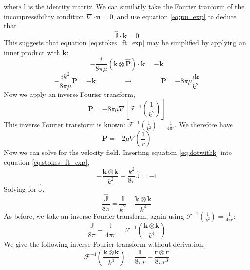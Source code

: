 \documentclass[11pt]{ucthesis}
\begin{document}
where $\mathbb{I}$ is the identity matrix. We can similarly take the Fourier tranform of the incompressibility condition $\nabla\cdot\mathbf{u} = 0$, and use equation \ref{eq:pu_exp} to deduce that
\begin{equation}
\hat{\mathbb{J}}\cdot \mathbf{k} = 0
\end{equation}
This suggests that equation \ref{eq:stokes_ft_exp} may be simplified by applying an inner product with $\mathbf{k}$:
\[
-\frac{i}{8\pi\mu}(\mathbf{k}\otimes\hat{\mathbf{P}})\cdot\mathbf{k} = -\mathbf{k}
\]
\begin{equation}
\label{eq:dotwithk}
-\frac{ik^2}{8\pi\mu}\hat{\mathbf{P}} = -\mathbf{k} \qquad\qquad\rightarrow\qquad\qquad \hat{\mathbf{P}} = -8\pi\mu\frac{i\mathbf{k}}{k^2}
\end{equation}
Now we apply an inverse Fourier transform,
\begin{equation}
\mathbf{P} = -8\pi\mu \nabla \left[\mathcal{F}^{-1}\left(\frac{1}{k^2}\right)\right]
\end{equation}
This inverse Fourier transform is known: $\mathcal{F}^{-1}\left(\frac{1}{k^2}\right) = \frac{1}{4\pi r}$. We therefore have
\begin{equation}
\label{eq:Pfinal}
\mathbf{P} = -2\mu \nabla \left(\frac1r\right)
\end{equation}
Now we can solve for the velocity field. Inserting equation \ref{eq:dotwithk} into equation \ref{eq:stokes_ft_exp},
\begin{equation}
\label{eq:subinP}
-\frac{\mathbf{k}\otimes\mathbf{k}}{k^2} - \frac{k^2}{8\pi}\hat{\mathbb{J}} = -\mathbb{I}
\end{equation}
Solving for $\hat{\mathbb{J}}$,
\begin{equation}
\label{eq:Jhat}
\frac{\hat{\mathbb{J}}}{8\pi} = \frac{\mathbb{I}}{k^2} - \frac{\mathbf{k}\otimes\mathbf{k}}{k^4}
\end{equation}
As before, we take an inverse Fourier transform, again using $\mathcal{F}^{-1}\left(\frac{1}{k^2}\right) = \frac{1}{4\pi r}$:
\begin{equation}
\label{eq:JwithIFT}
\frac{\mathbb{J}}{8\pi} = \frac{\mathbb{I}}{4\pi r} - \mathcal{F}^{-1}\left(\frac{\mathbf{k}\otimes\mathbf{k}}{k^4}\right)
\end{equation}
We give the following inverse Fourier transform without derivation:
\begin{equation}
\mathcal{F}^{-1}\left(\frac{\mathbf{k}\otimes\mathbf{k}}{k^4}\right) = \frac{\mathbb{I}}{8\pi r} - \frac{\mathbf{r\otimes r}}{8\pi r^3}
\end{equation}
\end{document}
